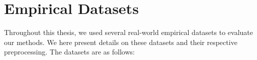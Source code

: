 
\chapter{Empirical Datasets}
\label{ch:EmpiricalDatasets}


Throughout this thesis, we used several real-world empirical datasets to evaluate our methods.
We here present details on these datasets and their respective preprocessing.
The datasets are as follows:

